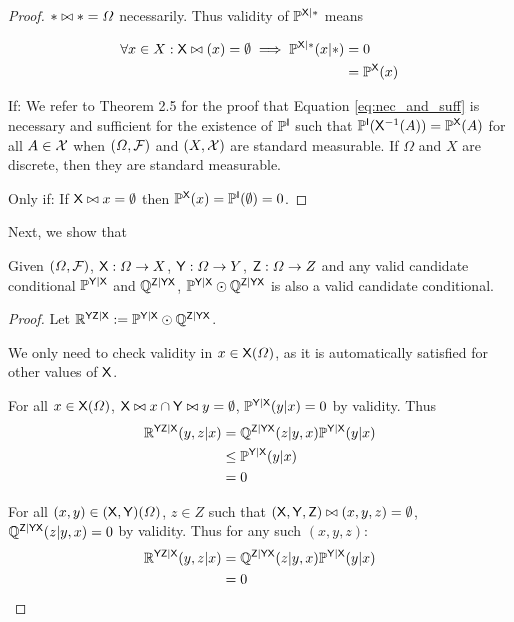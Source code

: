 \begin{proof}
$*\bowtie *=\Omega$ necessarily. Thus validity of $\mathbb{P}^{\mathsf{X}|*}$ means 

\begin{align}
	\forall x\in X: \mathsf{X}\bowtie (x)=\emptyset \implies \mathbb{P}^{\mathsf{X}|*}(x|*)&=0\\
	&= \mathbb{P}^{\mathsf{X}}(x)\label{eq:nec_and_suff}
\end{align}

If: We refer to \citet{ershov_extension_1975} Theorem 2.5 for the proof that Equation \ref{eq:nec_and_suff} is necessary and sufficient for the existence of $\mathbb{P}^{\mathsf{I}}$ such that $\mathbb{P}^{\mathsf{I}}(\mathsf{X}^{-1}(A))=\mathbb{P}^{\mathsf{X}}(A)$ for all $A\in \mathcal{X}$ when $(\Omega,\mathcal{F})$ and $(X,\mathcal{X})$ are standard measurable. If $\Omega$ and $X$ are discrete, then they are standard measurable.

Only if: If $\mathsf{X}\bowtie x=\emptyset$ then $\mathbb{P}^{\mathsf{X}}(x)=\mathbb{P}^{\mathsf{I}}(\emptyset)=0$.
\end{proof}

Next, we show that 

\begin{lemma}\label{lem:valid_extendability}
Given $(\Omega,\mathcal{F})$, $\mathsf{X}:\Omega\to X$, $\mathsf{Y}:\Omega\to Y$, $\mathsf{Z}:\Omega\to Z$ and any valid candidate conditional $\mathbb{P}^{\mathsf{Y}|\mathsf{X}}$ and $\mathbb{Q}^{\mathsf{Z}|\mathsf{Y}\mathsf{X}}$, $ \mathbb{P}^{\mathsf{Y}|\mathsf{X}}\odot \mathbb{Q}^{\mathsf{Z}|\mathsf{Y}\mathsf{X}}$ is also a valid candidate conditional.
\end{lemma}

\begin{proof}
Let $\mathbb{R}^{\mathsf{YZ}|\mathsf{X}}:=\mathbb{P}^{\mathsf{Y}|\mathsf{X}}\odot \mathbb{Q}^{\mathsf{Z}|\mathsf{Y}\mathsf{X}}$.

We only need to check validity in $x\in \mathsf{X}(\Omega)$, as it is automatically satisfied for other values of $\mathsf{X}$.

For all $x\in \mathsf{X}(\Omega)$, $\mathsf{X}\bowtie x\cap\mathsf{Y}\bowtie y=\emptyset$, $\mathbb{P}^{\mathsf{Y}|\mathsf{X}}(y|x)=0$ by validity. Thus
\begin{align}
	\mathbb{R}^{\mathsf{YZ}|\mathsf{X}}(y,z|x) &= \mathbb{Q}^{\mathsf{Z}|\mathsf{YX}}(z|y,x)\mathbb{P}^{\mathsf{Y}|\mathsf{X}}(y|x)\\
								  &\leq \mathbb{P}^{\mathsf{Y}|\mathsf{X}}(y|x)\\
								  &=0
\end{align}

For all $(x,y)\in (\mathsf{X},\mathsf{Y})(\Omega)$, $z\in Z$ such that $(\mathsf{X},\mathsf{Y},\mathsf{Z})\bowtie (x,y,z)=\emptyset$, $\mathbb{Q}^{\mathsf{Z}|\mathsf{YX}}(z|y,x)=0$ by validity. Thus for any such $(x,y,z)$:
\begin{align}
	\mathbb{R}^{\mathsf{YZ}|\mathsf{X}}(y,z|x) &= \mathbb{Q}^{\mathsf{Z}|\mathsf{YX}}(z|y,x)\mathbb{P}^{\mathsf{Y}|\mathsf{X}}(y|x)\\
								  &=0
\end{align}
\end{proof}

